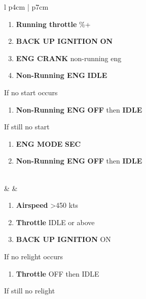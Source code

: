 \documentclass[8pt,usenames,dvipsnames,twoside]{article}
\begin{document}
\begin{center}
\begin{longtable}{l p{4cm} | p{7cm}}
\begin{minipage}[t]{\linewidth}
\begin{enumerate}[label=(\alph*)]
						\item \textbf{Running throttle} \%+
						\item \textbf{BACK UP IGNITION} \dotfill \textbf{ON}
						\item \textbf{ENG CRANK} \dotfill non-running eng
						\item \textbf{Non-Running ENG} \dotfill \textbf{IDLE}
					\end{enumerate}
					\vspace{-7pt}
					If no start occurs
					\begin{enumerate}[label=(\alph*), resume]
						\vspace{-7pt}
						\item \textbf{Non-Running ENG} \dotfill \textbf{OFF} then \textbf{IDLE}
					\end{enumerate}
					\vspace{-7pt}
					If still no start
					\begin{enumerate}[label=(\alph*), resume]
						\vspace{-7pt}
						\item \textbf{ENG MODE} \dotfill \textbf{SEC}
						\item \textbf{Non-Running ENG} \dotfill \textbf{OFF} then \textbf{IDLE}
					\end{enumerate}
				\end{minipage} \\
				\midrule
				\textbullet &  &
				\begin{minipage}[t]{\linewidth}
					\vspace{-7pt}
					\begin{enumerate}[label=(\alph*)]
						\item \textbf{Airspeed} \dotfill >450 kts
						\item \textbf{Throttle} \dotfill IDLE or above
						\item \textbf{BACK UP IGNITION} \dotfill ON
					\end{enumerate}
					\vspace{-7pt}
					If no relight occurs
					\begin{enumerate}[label=(\alph*), resume]
						\vspace{-7pt}
						\item \textbf{Throttle} \dotfill OFF then IDLE
					\end{enumerate}
					\vspace{-7pt}
					If still no relight
					\begin{enumerate}[label=(\alph*), resume]

\end{enumerate}
\end{minipage}
\end{longtable}
\end{center}
\end{document}
